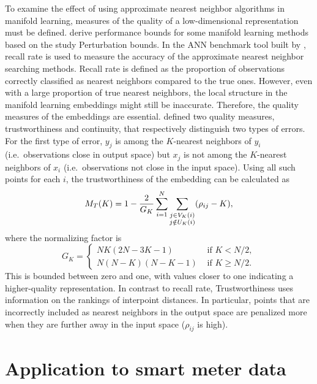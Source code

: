 \documentclass{article}
\begin{document}
To examine the effect of using approximate nearest neighbor algorithms
in manifold learning, measures of the quality of a low-dimensional
representation must be defined. \citet{Arias-Castro2020-th} derive
performance bounds for some manifold learning methods based on the study
Perturbation bounds. In the ANN benchmark tool built by
\citet{Aumuller2020-nk}, recall rate is used to measure the accuracy of
the approximate nearest neighbor searching methods. Recall rate is
defined as the proportion of observations correctly classified as
nearest neighbors compared to the true ones. However, even with a large
proportion of true nearest neighbors, the local structure in the
manifold learning embeddings might still be inaccurate. Therefore, the
quality measures of the embeddings are essential. \citet{Venna2006-nd}
defined two quality measures, trustworthiness and continuity, that
respectively distinguish two types of errors. For the first type of
error, \(y_j\) is among the \(K\)-nearest neighbors of \(y_i\)
(i.e.~observations close in output space) but \(x_j\) is not among the
\(K\)-nearest neighbors of \(x_i\) (i.e.~observations not close in the
input space). Using all such points for each \(i\), the trustworthiness
of the embedding can be calculated as
\begin{equation}\label{eq:trustworthiness}
  M_{T}(K)=1-\frac{2}{G_{K}} \sum_{i=1}^{N} \sum\limits_{\begin{subarray}{c}j \in V_{K}(i)\\j \notin U_{K}(i)\end{subarray}}(\rho_{ij}-K),
\end{equation} where the normalizing factor is \begin{equation}
  G_{K}=\left\{
  \begin{array}{ll}
    N K(2 N-3 K-1) & \text { if } K < N / 2, \\
    N(N-K)(N-K-1) & \text { if } K \geq N / 2.
  \end{array}
\right.
\end{equation} This is bounded between zero and one, with values closer
to one indicating a higher-quality representation. In contrast to recall
rate, Trustworthiness uses information on the rankings of interpoint
distances. In particular, points that are incorrectly included as
nearest neighbors in the output space are penalized more when they are
further away in the input space (\(\rho_{ij}\) is high).

\hypertarget{smartmeter}{%
\section{Application to smart meter data}\label{smartmeter}}
\end{document}

